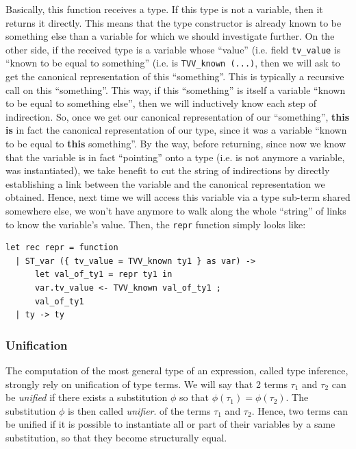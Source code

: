 Basically, this function receives a type. If this type is not a
variable, then it returns it directly. This means that the type
constructor is already known to be something else than a variable for
which we should investigate further. On the other side, if the
received type is a variable whose ``value'' (i.e. field
{\tt tv\_value} is ``known to be equal to something'' (i.e. is
{\tt TVV\_known (...)}, then we will ask to get the canonical
representation of this ``something''. This is typically a recursive
call on this ``something''. This way, if this ``something'' is itself
a variable ``known to be equal to something else'', then we will
inductively know each step of indirection. So, once we get our
canonical representation of our ``something'', {\bf this is} in fact
the canonical representation of our type, since it was a variable
``known to be equal to {\bf this} something''. By the way, before
returning, since now we know that the variable is in fact ``pointing''
onto a type (i.e. is not anymore a variable, was instantiated), we
take benefit to cut the string of indirections by directly
establishing a link between the variable and the canonical
representation we obtained. Hence, next time we will access this
variable via a type sub-term shared somewhere else, we won't have
anymore to walk along the whole ``string'' of links to know the
variable's value. Then, the {\tt repr} function simply looks like:

{\footnotesize
\begin{lstlisting}[language=MyOCaml,
                   title=Getting the canonical representation of a type]
let rec repr = function
  | ST_var ({ tv_value = TVV_known ty1 } as var) ->
      let val_of_ty1 = repr ty1 in
      var.tv_value <- TVV_known val_of_ty1 ;
      val_of_ty1
  | ty -> ty
\end{lstlisting}
}


\subsubsection{Unification}
The computation of the most general type of an expression, called type
inference, strongly rely on unification of type terms. We will say
that 2 terms $\tau_1$ and $\tau_2$ can be {\em unified} if there exists
a substitution $\phi$ so that $\phi(\tau_1) = \phi (\tau_2)$. The
substitution $\phi$ is then called {\em unifier}.
 of the terms $\tau_1$ and $\tau_2$. Hence, two terms
can be unified if it is possible to instantiate all or part of their
variables by a same substitution, so that they become structurally
equal.


